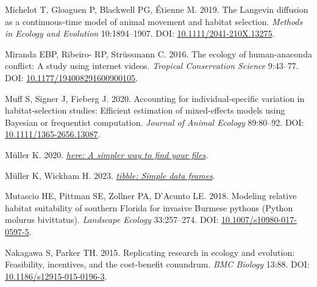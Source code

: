 \documentclass[10pt,a4paper]{article}
\newlength{\cslhangindent}
\newenvironment{CSLReferences}[2] %
 {\begin{list}{}{%
  \setlength{\itemindent}{0pt}
  \setlength{\leftmargin}{0pt}
  \setlength{\parsep}{0pt}
  \ifodd #1
   \setlength{\leftmargin}{\cslhangindent}
   \setlength{\itemindent}{-1\cslhangindent}
  \fi
  \setlength{\itemsep}{#2\baselineskip}}}
 {\end{list}}
\begin{document}
\begin{CSLReferences}{1}{0}
Michelot T, Gloaguen P, Blackwell PG, Étienne M. 2019. The {Langevin} diffusion as a continuous‐time model of animal movement and habitat selection. \emph{Methods in Ecology and Evolution} 10:1894--1907. DOI: \href{https://doi.org/10.1111/2041-210X.13275}{10.1111/2041-210X.13275}.

Miranda EBP, Ribeiro- RP, Strüssmann C. 2016. The ecology of human-anaconda conflict: A study using internet videos. \emph{Tropical Conservation Science} 9:43--77. DOI: \href{https://doi.org/10.1177/194008291600900105}{10.1177/194008291600900105}.

Muff S, Signer J, Fieberg J. 2020. Accounting for individual‐specific variation in habitat‐selection studies: {Efficient} estimation of mixed‐effects models using {Bayesian} or frequentist computation. \emph{Journal of Animal Ecology} 89:80--92. DOI: \href{https://doi.org/10.1111/1365-2656.13087}{10.1111/1365-2656.13087}.

Müller K. 2020. \emph{\href{https://CRAN.R-project.org/package=here}{{here}: A simpler way to find your files}}.

Müller K, Wickham H. 2023. \emph{\href{https://CRAN.R-project.org/package=tibble}{{tibble}: Simple data frames}}.

Mutascio HE, Pittman SE, Zollner PA, D'Acunto LE. 2018. Modeling relative habitat suitability of southern {Florida} for invasive {Burmese} pythons ({Python} molurus bivittatus). \emph{Landscape Ecology} 33:257--274. DOI: \href{https://doi.org/10.1007/s10980-017-0597-5}{10.1007/s10980-017-0597-5}.

Nakagawa S, Parker TH. 2015. Replicating research in ecology and evolution: Feasibility, incentives, and the cost-benefit conundrum. \emph{BMC Biology} 13:88. DOI: \href{https://doi.org/10.1186/s12915-015-0196-3}{10.1186/s12915-015-0196-3}.


\end{CSLReferences}
\end{document}
